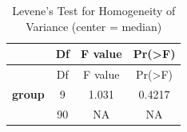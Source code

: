\documentclass[]{article}
\theoremstyle{definition}
\theoremstyle{definition}
\theoremstyle{definition}
\theoremstyle{remark}
\begin{document}
\begin{longtable}[]{@{}cccc@{}}
\caption{Levene's Test for Homogeneity of Variance (center =
median)}\tabularnewline
\toprule
\begin{minipage}[b]{0.15\columnwidth}\centering\strut
~\strut
\end{minipage} & \begin{minipage}[b]{0.06\columnwidth}\centering\strut
Df\strut
\end{minipage} & \begin{minipage}[b]{0.12\columnwidth}\centering\strut
F value\strut
\end{minipage} & \begin{minipage}[b]{0.12\columnwidth}\centering\strut
Pr(\textgreater{}F)\strut
\end{minipage}\tabularnewline
\midrule
\endfirsthead
\toprule
\begin{minipage}[b]{0.15\columnwidth}\centering\strut
~\strut
\end{minipage} & \begin{minipage}[b]{0.06\columnwidth}\centering\strut
Df\strut
\end{minipage} & \begin{minipage}[b]{0.12\columnwidth}\centering\strut
F value\strut
\end{minipage} & \begin{minipage}[b]{0.12\columnwidth}\centering\strut
Pr(\textgreater{}F)\strut
\end{minipage}\tabularnewline
\midrule
\endhead
\begin{minipage}[t]{0.15\columnwidth}\centering\strut
\textbf{group}\strut
\end{minipage} & \begin{minipage}[t]{0.06\columnwidth}\centering\strut
9\strut
\end{minipage} & \begin{minipage}[t]{0.12\columnwidth}\centering\strut
1.031\strut
\end{minipage} & \begin{minipage}[t]{0.12\columnwidth}\centering\strut
0.4217\strut
\end{minipage}\tabularnewline
\begin{minipage}[t]{0.15\columnwidth}\centering\strut
\strut
\end{minipage} & \begin{minipage}[t]{0.06\columnwidth}\centering\strut
90\strut
\end{minipage} & \begin{minipage}[t]{0.12\columnwidth}\centering\strut
NA\strut
\end{minipage} & \begin{minipage}[t]{0.12\columnwidth}\centering\strut
NA\strut
\end{minipage}\tabularnewline
\bottomrule
\end{longtable}
\end{document}
